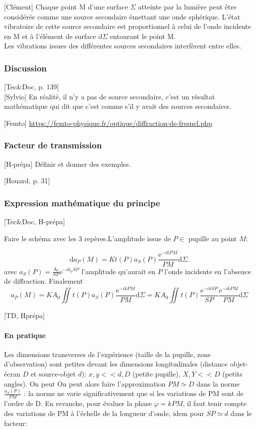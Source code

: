 \documentclass[11pt]{report}
\numberwithin{figure}{section}
\numberwithin{equation}{section}
\numberwithin{table}{section}
\newcommand{\ud}{\mathrm{d}}
\newcommand{\e}{\mathrm{e}}
\newcommand{\1}{\boldsymbol{1}}
\begin{document}
[Clément] Chaque point M d’une surface $\Sigma$ atteinte par la lumière peut être considérée comme une source secondaire émettant une onde sphérique. L’état vibratoire de cette source secondaire est proportionnel à celui de l’onde incidente en M et à l’élément de surface $\ud \Sigma$ entourant le point M. \\
Les vibrations issues des différentes sources secondaires interfèrent entre elles.	



\subsubsection{Discussion}

[Tec\&Doc, p. 139] \\

[Sylvio] En réalité, il n’y a pas de source secondaire, c’est un résultat mathématique qui dit que c’est comme s’il y avait
des sources secondaires.

[Femto] \url{https://femto-physique.fr/optique/diffraction-de-fresnel.php}


\subsubsection{Facteur de transmission}

[H-prépa] Définir et donner des exemples.

[Houard, p. 31]


\subsubsection{Expression mathématique du principe}  [Tec\&Doc, H-prépa]

Faire le schéma avec les 3 repères.L'amplitude issue de $P \in$ pupille au point $M$:

\begin{equation}
\ud a_P(M) = K t(P) a_S(P) \frac{\e^{-i k PM}}{PM} \ud \Sigma.
\end{equation}
avec $a_S(P) = \frac{A_0}{SP} \e^{- i k_0 SP}$ l'amplitude qu'aurait en $P$ l'onde incidente en l'absence de diffraction. Finalement
\begin{equation}
a_P(M) = K A_0 \iint t(P) a_S(P) \frac{\e^{-i k PM}}{PM} \ud \Sigma = K A_0 \iint t(P) \frac{\e^{- i k SP}}{SP} \frac{\e^{-i k PM}}{PM} \ud \Sigma
\end{equation}

[TD, Hprépa]
\paragraph{En pratique} Les dimensions transverses de l'expérience (taille de la pupille, zone d'observation) sont petites devant les dimensions longitudinales (distance objet-écran $D$ et source-objet $d$): $x,y << d,D$ (petite pupille), $X,Y << D$ (petits angles). On peut On peut alors faire l’approximation $PM \simeq D$ dans la norme $\frac{a_S(P)}{PM}$ : la norme ne varie significativement que si les variations de PM sont de l’ordre de D. En revanche, pour évaluer la phase $\varphi = k PM$, il faut tenir compte des variations de PM à l’échelle de la longueur d’onde, idem pour $SP \simeq d$ dans le facteur:
\end{document}
